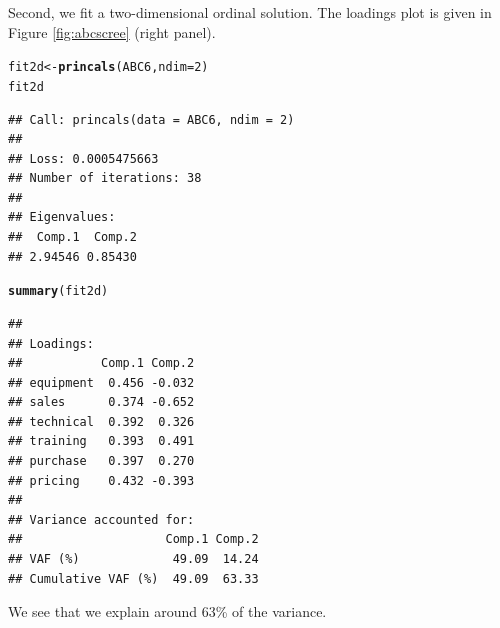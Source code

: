 \documentclass[10pt,nojss,nofooter,fleqn]{jss}\usepackage[]{graphicx}\usepackage[]{color}
\makeatletter
\newcommand{\hlnum}[1]{\textcolor[rgb]{0.686,0.059,0.569}{#1}}%
\newcommand{\hlstd}[1]{\textcolor[rgb]{0.345,0.345,0.345}{#1}}%
\newcommand{\hlkwb}[1]{\textcolor[rgb]{0.69,0.353,0.396}{#1}}%
\newcommand{\hlkwc}[1]{\textcolor[rgb]{0.333,0.667,0.333}{#1}}%
\newcommand{\hlkwd}[1]{\textcolor[rgb]{0.737,0.353,0.396}{\textbf{#1}}}%
\newenvironment{kframe}{%
 \def\at@end@of@kframe{}%
 \ifinner\ifhmode%
  \def\at@end@of@kframe{\end{minipage}}%
  \begin{minipage}{\columnwidth}%
 \fi\fi%
 \def\FrameCommand##1{\hskip\@totalleftmargin \hskip-\fboxsep
 \colorbox{shadecolor}{##1}\hskip-\fboxsep
     \hskip-\linewidth \hskip-\@totalleftmargin \hskip\columnwidth}%
 \MakeFramed {\advance\hsize-\width
   \@totalleftmargin\z@ \linewidth\hsize
   \@setminipage}}%
 {\par\unskip\endMakeFramed%
 \at@end@of@kframe}
\newenvironment{knitrout}{}{} %
\makeatother
\begin{document}
Second, we fit a two-dimensional ordinal solution. The loadings plot is given in Figure \ref{fig:abcscree} (right panel). 
\begin{knitrout}
\color{fgcolor}\begin{kframe}
\begin{alltt}
\hlstd{fit2d} \hlkwb{<-} \hlkwd{princals}\hlstd{(ABC6,} \hlkwc{ndim} \hlstd{=} \hlnum{2}\hlstd{)}
\hlstd{fit2d}
\end{alltt}
\begin{verbatim}
## Call: princals(data = ABC6, ndim = 2)
## 
## Loss: 0.0005475663
## Number of iterations: 38 
## 
## Eigenvalues:
##  Comp.1  Comp.2 
## 2.94546 0.85430
\end{verbatim}
\begin{alltt}
\hlkwd{summary}\hlstd{(fit2d)}
\end{alltt}
\begin{verbatim}
## 
## Loadings: 
##           Comp.1 Comp.2
## equipment  0.456 -0.032
## sales      0.374 -0.652
## technical  0.392  0.326
## training   0.393  0.491
## purchase   0.397  0.270
## pricing    0.432 -0.393
## 
## Variance accounted for:
##                    Comp.1 Comp.2
## VAF (%)             49.09  14.24
## Cumulative VAF (%)  49.09  63.33
\end{verbatim}
\end{kframe}
\end{knitrout}
We see that we explain around 63\% of the variance.
\end{document}
